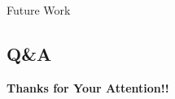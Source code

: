 \begin{frame}{Future Work}

\end{frame}
\subsection{Q\&A}
\begin{frame}
\centering
\vspace{3cm}
{\Huge{\color{myOrange}\textbf{Thanks for Your Attention!!}}}
\end{frame}